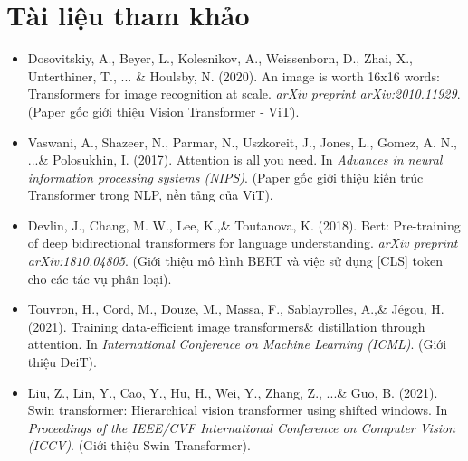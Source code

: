 \section*{Tài liệu tham khảo}
\begin{itemize}
	\item[1] Dosovitskiy, A., Beyer, L., Kolesnikov, A., Weissenborn, D., Zhai, X., Unterthiner, T., ... \& Houlsby, N. (2020). An image is worth 16x16 words: Transformers for image recognition at scale. \textit{arXiv preprint arXiv:2010.11929}. (Paper gốc giới thiệu Vision Transformer - ViT).
	\item[2] Vaswani, A., Shazeer, N., Parmar, N., Uszkoreit, J., Jones, L., Gomez, A. N., ...\& Polosukhin, I. (2017). Attention is all you need. In \textit{Advances in neural information processing systems (NIPS)}. (Paper gốc giới thiệu kiến trúc Transformer trong NLP, nền tảng của ViT).
	\item[3] Devlin, J., Chang, M. W., Lee, K.,\& Toutanova, K. (2018). Bert: Pre-training of deep bidirectional transformers for language understanding. \textit{arXiv preprint arXiv:1810.04805}. (Giới thiệu mô hình BERT và việc sử dụng [CLS] token cho các tác vụ phân loại).
	\item[4] Touvron, H., Cord, M., Douze, M., Massa, F., Sablayrolles, A.,\& Jégou, H. (2021). Training data-efficient image transformers\& distillation through attention. In \textit{International Conference on Machine Learning (ICML)}. (Giới thiệu DeiT).
	\item[5] Liu, Z., Lin, Y., Cao, Y., Hu, H., Wei, Y., Zhang, Z., ...\& Guo, B. (2021). Swin transformer: Hierarchical vision transformer using shifted windows. In \textit{Proceedings of the IEEE/CVF International Conference on Computer Vision (ICCV)}. (Giới thiệu Swin Transformer).
\end{itemize}